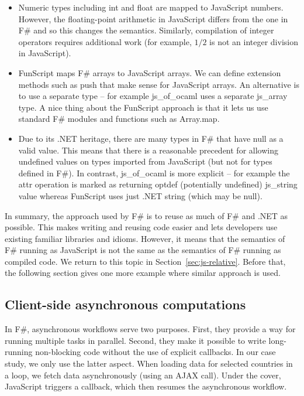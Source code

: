 \documentclass[submission,copyright,creativecommons]{eptcs}
\newcommand{\kvd}[1]{\textnormal{\textcolor{kvdclr}{\sffamily #1}}}
\newcommand{\ident}[1]{\textnormal{\sffamily #1}}
\begin{document}
\begin{itemize}
\item Numeric types including \ident{int} and \ident{float} are mapped to JavaScript numbers.
  However, the floating-point arithmetic in JavaScript differs from the one in F\# and so this changes
  the semantics. Similarly, compilation of integer operators requires additional work (for
  example, $1/2$ is not an integer division in JavaScript).

\item FunScript maps F\# arrays to JavaScript arrays. We can define extension methods
  such as \ident{push} that make sense for JavaScript arrays. An alternative is to use a
  separate type -- for example js\_of\_ocaml uses a separate \ident{js\_array} type.
  A nice thing about the FunScript approach is that it lets us use standard F\# modules
  and functions such as \ident{Array.map}.

\item Due to its .NET heritage, there are many types in F\# that have \kvd{null} as a valid
  value. This means that there is a reasonable precedent for allowing \kvd{undefined} values
  on types imported from JavaScript (but not for types defined in F\#). In contrast,
  js\_of\_ocaml is more explicit -- for example the \ident{attr} operation is marked as
  returning \ident{optdef} (potentially undefined) \ident{js\_string} value whereas FunScript
  uses just .NET \ident{string} (which may be \kvd{null}).
\end{itemize}

\noindent
In summary, the approach used by F\# is to reuse as much of F\# and .NET as possible. This
makes writing and reusing code easier and lets developers use existing familiar libraries and
idioms. However, it means that the semantics of F\# running as JavaScript is not the same as the
semantics of F\# running as compiled code. We return to this topic in Section~\ref{sec:js-relative}.
Before that, the following section gives one more example where similar approach is used.

\subsection{Client-side asynchronous computations}
\label{sec:js-async}

In F\#, asynchronous workflows \cite{fsharp-async} serve two purposes. First, they provide a
way for running multiple tasks in parallel. Second, they make it possible to write long-running
non-blocking code without the use of explicit callbacks. In our case study, we only use the
latter aspect. When loading data for selected countries in a loop, we fetch data asynchronously
(using an AJAX call). Under the cover, JavaScript triggers a callback, which then resumes the
asynchronous workflow.
\end{document}
